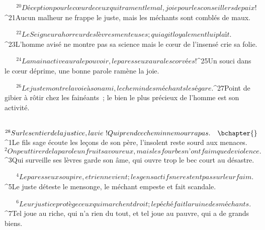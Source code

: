            
         
${}^{20}Déception pour le cœur de ceux qui trament le mal,
        joie pour les conseillers de paix !
        
           
         
${}^{21}Aucun malheur ne frappe le juste,
        mais les méchants sont comblés de maux.
        
           
         
${}^{22}Le Seigneur a horreur des lèvres menteuses ;
        qui agit loyalement lui plaît.
        
           
         
${}^{23}L’homme avisé ne montre pas sa science
        mais le cœur de l’insensé crie sa folie.
        
           
         
${}^{24}La main active aura le pouvoir,
        le paresseux aura les corvées !
        
           
         
${}^{25}Un souci dans le cœur déprime,
        une bonne parole ramène la joie.
        
           
         
${}^{26}Le juste montre la voie à son ami,
        le chemin des méchants les égare.
        
           
         
${}^{27}Point de gibier à rôtir chez les fainéants ;
        le bien le plus précieux de l’homme est son activité.
        
           
         
${}^{28}Sur le sentier de la justice, la vie !
        Qui prend ce chemin ne mourra pas.
        
           
       
      
         
      \bchapter{}
${}^{1}Le fils sage écoute les leçons de son père,
        l’insolent reste sourd aux menaces.
${}^{2}On peut tirer de la parole un fruit savoureux,
        mais les fourbes n’ont faim que de violence.
        
           
         
${}^{3}Qui surveille ses lèvres garde son âme,
        qui ouvre trop le bec court au désastre.
        
           
         
${}^{4}Le paresseux soupire, et rien ne vient ;
        les gens actifs ne restent pas sur leur faim.
        
           
         
${}^{5}Le juste déteste le mensonge,
        le méchant empeste et fait scandale.
        
           
         
${}^{6}Leur justice protège ceux qui marchent droit ;
        le péché fait la ruine des méchants.
        
           
         
${}^{7}Tel joue au riche, qui n’a rien du tout,
        et tel joue au pauvre, qui a de grands biens.
        
